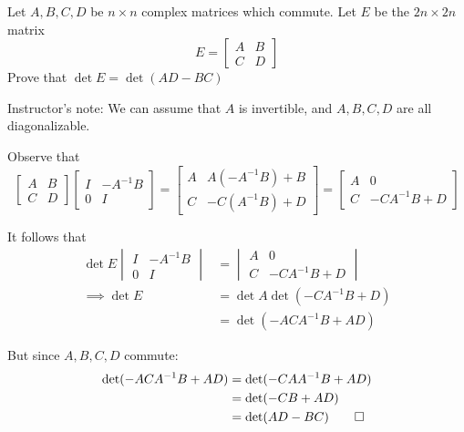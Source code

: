 \documentclass[a4paper, 10pt]{article}
\begin{document}
\begin{problem} 
Let \(A, B, C, D\) be \(n \times n\) complex matrices which commute. Let \(E\) be the \(2n \times 2n \) matrix \[
    E = \begin{bmatrix}
        A & B \\
        C & D
    \end{bmatrix}
\]
Prove that \(\det E = \det (AD-BC)\)

Instructor's note: We can assume that \(A\) is invertible, and \(A, B, C, D\) are all diagonalizable.
\end{problem}
\begin{solution}
    Observe that \[
        \begin{bmatrix}
            A & B \\
            C & D
        \end{bmatrix} \begin{bmatrix}
            I & -A^{-1}B \\
            0 & I
        \end{bmatrix} = \begin{bmatrix}
            A & A(-A^{-1}B) + B \\
            C & -C(A^{-1}B) + D
        \end{bmatrix} = \begin{bmatrix}
            A & 0             \\
            C & -CA^{-1}B + D
        \end{bmatrix}
    \]

    It follows that
    \begin{align*}
        \det E \begin{vmatrix}
                   I & -A^{-1}B \\
                   0 & I
               \end{vmatrix} & = \begin{vmatrix}
                                     A & 0             \\
                                     C & -CA^{-1}B + D
                                 \end{vmatrix} \\
        \implies \det E &= \det A \det (-CA^{-1}B + D) \\
        &= \det(-ACA^{-1}B + AD)
    \end{align*}

    But since \(A, B, C, D\) commute:
    \begin{align*}
        \det(-ACA^{-1}B + AD) &= \det(-CAA^{-1}B + AD)\\
        &= \det(-CB + AD) \\
        &= \det (AD-BC) \qedhere
    \end{align*}
\end{solution}
\end{document}

